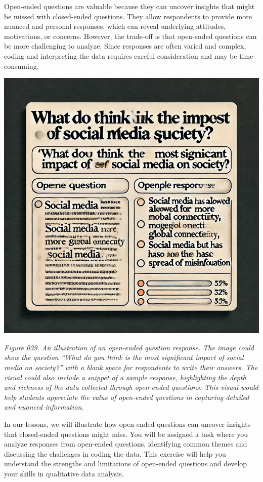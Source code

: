 \documentclass[
]{book}
\begin{document}
Open-ended questions are valuable because they can uncover insights that might be missed with closed-ended questions. They allow respondents to provide more nuanced and personal responses, which can reveal underlying attitudes, motivations, or concerns. However, the trade-off is that open-ended questions can be more challenging to analyze. Since responses are often varied and complex, coding and interpreting the data requires careful consideration and may be time-consuming.

\includegraphics[width=1\linewidth,height=\textheight,keepaspectratio]{images/fig039.jpg}

\emph{Figure 039. An illustration of an open-ended question response. The image could show the question ``What do you think is the most significant impact of social media on society?'' with a blank space for respondents to write their answers. The visual could also include a snippet of a sample response, highlighting the depth and richness of the data collected through open-ended questions. This visual would help students appreciate the value of open-ended questions in capturing detailed and nuanced information.}

In our lessons, we will illustrate how open-ended questions can uncover insights that closed-ended questions might miss. You will be assigned a task where you analyze responses from open-ended questions, identifying common themes and discussing the challenges in coding the data. This exercise will help you understand the strengths and limitations of open-ended questions and develop your skills in qualitative data analysis.
\end{document}

